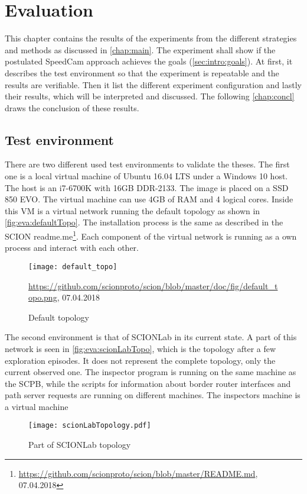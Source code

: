 \documentclass[thesis.tex]{subfiles}
\begin{document}
\chapter{Evaluation}\label{chap:eva}

This chapter contains the results of the experiments from the different strategies and methods as discussed in \autoref{chap:main}. The experiment shall show if the postulated SpeedCam approach achieves the goals (\autoref{sec:intro:goals}). At first, it describes the test environment so that the experiment is repeatable and the results are verifiable. Then it list the different experiment configuration and lastly their results, which will be interpreted and discussed. The following \autoref{chap:concl} draws the conclusion of these results.

\section{Test environment}

There are two different used test environments to validate the theses.
The first one is a local virtual machine of Ubuntu 16.04 LTS under a Windows 10 host. The host is an i7-6700K with 16GB DDR-2133. The image is placed on a SSD 850 EVO. The virtual machine can use 4GB of RAM and 4 logical cores. Inside this VM is a virtual network running the default topology as shown in \autoref{fig:eva:defaultTopo}. The installation process is the same as described in the SCION readme.me\footnote{\url{https://github.com/scionproto/scion/blob/master/README.md}, 07.04.2018}. Each component of the virtual network is running as a own process and interact with each other.

\begin{figure}
	\centering
	\texttt{[image: default\_topo]}
	\caption*{\tiny{\url{https://github.com/scionproto/scion/blob/master/doc/fig/default_topo.png}, 07.04.2018}}
	\caption{Default topology}
	\label{fig:eva:defaultTopo}
\end{figure}

The second environment is that of SCIONLab in its current state. A part of this network is seen in \autoref{fig:eva:scionLabTopo}, which is the topology after a few exploration episodes. It does not represent the complete topology, only the current observed one. The inspector program is running on the same machine as the SCPB, while the scripts for information about border router interfaces and path server requests are running on different machines. The inspectors machine is a virtual machine 

\begin{figure}
	\centering
	\texttt{[image: scionLabTopology.pdf]}
	\caption{Part of SCIONLab topology}
	\label{fig:eva:scionLabTopo}
\end{figure}

\subfilebib %
\end{document}
